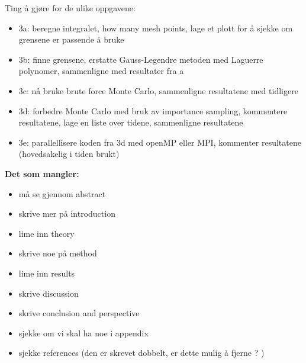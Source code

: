 \documentclass{article}
\begin{document}
Ting å gjøre for de ulike oppgavene:
\begin{itemize}

  \item 3a: beregne integralet, how many mesh points, lage et plott for å sjekke om grensene er passende å bruke \\

  \item 3b: finne grensene, erstatte Gauss-Legendre metoden med Laguerre polynomer, sammenligne med resultater fra a \\

  \item 3c: nå bruke brute force Monte Carlo, sammenligne resultatene med tidligere \\

  \item 3d: forbedre Monte Carlo med bruk av importance sampling, kommentere resultatene, lage en liste over tidene, sammenligne resultatene \\

  \item 3e: parallellisere koden fra 3d med openMP eller MPI, kommenter resultatene (hovedsakelig i tiden brukt)

\end{itemize}

\vspace{1cm}

\textbf{Det som mangler:}

\begin{itemize}
    \item må se gjennom abstract \\
    \item skrive mer på introduction \\
    \item lime inn theory \\
    \item skrive noe på method \\
    \item lime inn results \\
    \item skrive discussion \\
    \item skrive conclusion and perspective \\
    \item sjekke om vi skal ha noe i appendix \\
    \item sjekke references (den er skrevet dobbelt, er dette mulig å fjerne ? ) \\
\end{itemize}
\end{document}
